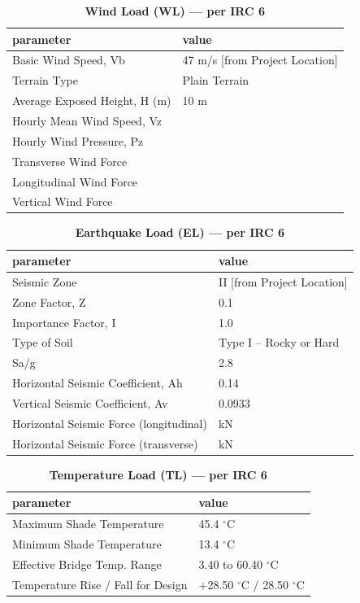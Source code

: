 \documentclass[12pt,a4paper]{report}
\numberwithin{table}{chapter}
\numberwithin{figure}{chapter}
\begin{document}
\vspace{1em}
\begin{longtable}{|L{5.5cm}|p{10.0cm}|}
\caption{\textbf{Wind Load (WL) --- per IRC 6}}
\hline
\textbf{parameter} & \textbf{value} \\
\hline
\textnormal{Basic Wind Speed, Vb} & 47 m/s [from Project Location] \\[6pt]
\hline
\textnormal{Terrain Type} & Plain Terrain \\[6pt]
\hline
\textnormal{Average Exposed Height, H (m)} & 10 m \\[6pt]
\hline
\textnormal{Hourly Mean Wind Speed, Vz} &  \\[6pt]
\hline
\textnormal{Hourly Wind Pressure, Pz} &  \\[6pt]
\hline
\textnormal{Transverse Wind Force} &  \\[6pt]
\hline
\textnormal{Longitudinal Wind Force} &  \\[6pt]
\hline
\textnormal{Vertical Wind Force} &  \\[6pt]
\hline
\end{longtable}

\vspace{1em}
\begin{longtable}{|L{5.5cm}|p{10.0cm}|}
\caption{\textbf{Earthquake Load (EL) --- per IRC 6}}
\hline
\textbf{parameter} & \textbf{value} \\
\hline
\textnormal{Seismic Zone} & II [from Project Location] \\[6pt]
\hline
\textnormal{Zone Factor, Z} & 0.1 \\[6pt]
\hline
\textnormal{Importance Factor, I} & 1.0 \\[6pt]
\hline
\textnormal{Type of Soil} & Type I – Rocky or Hard \\[6pt]
\hline
\textnormal{Sa/g} & 2.8 \\[6pt]
\hline
\textnormal{Horizontal Seismic Coefficient, Ah} & 0.14 \\[6pt]
\hline
\textnormal{Vertical Seismic Coefficient, Av} & 0.0933 \\[6pt]
\hline
\textnormal{Horizontal Seismic Force (longitudinal)} &  kN \\[6pt]
\hline
\textnormal{Horizontal Seismic Force (transverse)} &  kN \\[6pt]
\hline
\end{longtable}

\vspace{1em}
\begin{longtable}{|L{5.5cm}|p{10.0cm}|}
\caption{\textbf{Temperature Load (TL) --- per IRC 6}}
\hline
\textbf{parameter} & \textbf{value} \\
\hline
\textnormal{Maximum Shade Temperature} & 45.4 $^\circ$C \\[6pt]
\hline
\textnormal{Minimum Shade Temperature} & 13.4 $^\circ$C \\[6pt]
\hline
\textnormal{Effective Bridge Temp. Range} & 3.40 to 60.40 $^\circ$C \\[6pt]
\hline
\textnormal{Temperature Rise / Fall for Design} & +28.50 $^\circ$C / \textminus{}28.50 $^\circ$C \\[6pt]
\hline
\end{longtable}
\end{document}

